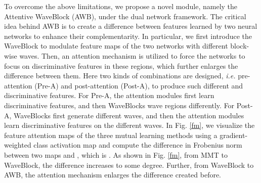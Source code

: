 \documentclass[journal]{IEEEtran}
\begin{document}
\begin{figure*}
\centering
{}
\centering
\caption{The gradient-weighted class activation maps of MMT \cite{ge2020mutual}, WaveBlock, and AWB. The differences in Frobenius norm between two maps for the three methods are ,  and , respectively. For MMT \cite{ge2020mutual}, the “focus” of the two networks is similar, and the activated areas are not very discriminative (not covering the full body and some are on the background). When using WaveBlock, the “focus” of the two networks becomes different. By combining attention modules with WaveBlock, the difference becomes even larger, and the activated areas of one network cover most of the body while the activated areas of another cover important points.}
\label{fm}
\end{figure*}
To overcome the above limitations, we propose a novel module, namely the Attentive WaveBlock (AWB), under the dual network framework. The critical idea behind AWB is to create a difference between features learned by two neural networks to enhance their complementarity. In particular, we first introduce the WaveBlock to modulate feature maps of the two networks with different block-wise waves. Then, an attention mechanism is utilized to force the networks to focus on discriminative features in these regions, which further enlarges the difference between them. Here two kinds of combinations are designed, \textit{i.e.} pre-attention (Pre-A) and post-attention (Post-A), to produce such different and discriminative features. For Pre-A, the attention modules first learn discriminative features, and then WaveBlocks wave regions differently. For Post-A, WaveBlocks first generate different waves, and then the attention modules learn discriminative features on the different waves. In Fig. \ref{fm}, we visualize the feature attention maps of the three mutual learning methods using a gradient-weighted class activation map \cite{selvaraju2017grad} and compute the difference in Frobenius norm between two maps  and , which is . As shown in Fig. \ref{fm}, from MMT \cite{ge2020mutual} to WaveBlock, the difference increases to some degree. Further, from WaveBlock to AWB, the attention mechanism enlarges the difference created before.
\end{document}
